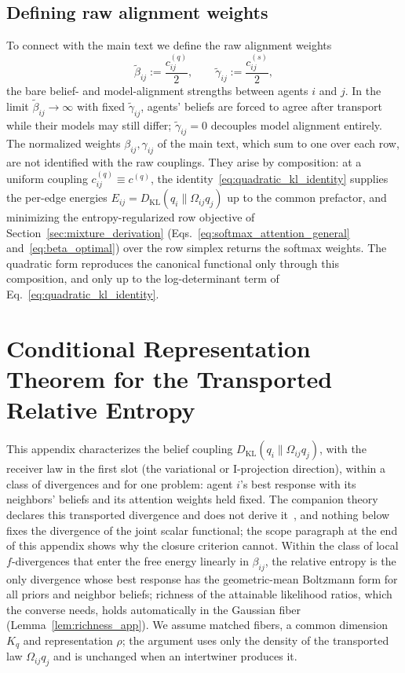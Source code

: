 \subsection{Defining raw alignment weights}
\label{sec:raw_alignment_weights}
To connect with the main text we define the raw alignment weights
\begin{equation}
\tilde\beta_{ij}:=\frac{c^{(q)}_{ij}}{2},
\qquad
\tilde\gamma_{ij}:=\frac{c^{(s)}_{ij}}{2},
\end{equation}
the bare belief- and model-alignment strengths between agents $i$ and $j$. In the limit $\tilde\beta_{ij} \to \infty$ with fixed $\tilde\gamma_{ij}$, agents' beliefs are forced to agree after transport while their models may still differ; $\tilde\gamma_{ij} = 0$ decouples model alignment entirely. The normalized weights $\beta_{ij}, \gamma_{ij}$ of the main text, which sum to one over each row, are not identified with the raw couplings. They arise by composition: at a uniform coupling $c^{(q)}_{ij} \equiv c^{(q)}$, the identity~\eqref{eq:quadratic_kl_identity} supplies the per-edge energies $E_{ij} = D_{\mathrm{KL}}(q_i \| \Omega_{ij}q_j)$ up to the common prefactor, and minimizing the entropy-regularized row objective of Section~\ref{sec:mixture_derivation} (Eqs.~\eqref{eq:softmax_attention_general} and~\eqref{eq:beta_optimal}) over the row simplex returns the softmax weights. The quadratic form reproduces the canonical functional only through this composition, and only up to the log-determinant term of Eq.~\eqref{eq:quadratic_kl_identity}.

\section{Conditional Representation Theorem for the Transported Relative Entropy}
\label{app:conditional_representation}

This appendix characterizes the belief coupling $D_{\mathrm{KL}}(q_i\|\Omega_{ij}q_j)$, with the receiver law in the first slot (the variational or I-projection direction), within a class of divergences and for one problem: agent $i$'s best response with its neighbors' beliefs and its attention weights held fixed. The companion theory declares this transported divergence and does not derive it~\cite[Chs.~6 and~12]{DennisGaugeVFE2026}, and nothing below fixes the divergence of the joint scalar functional; the scope paragraph at the end of this appendix shows why the closure criterion cannot. Within the class of local $f$-divergences that enter the free energy linearly in $\beta_{ij}$, the relative entropy is the only divergence whose best response has the geometric-mean Boltzmann form for all priors and neighbor beliefs; richness of the attainable likelihood ratios, which the converse needs, holds automatically in the Gaussian fiber (Lemma~\ref{lem:richness_app}). We assume matched fibers, a common dimension $K_q$ and representation $\rho$; the argument uses only the density of the transported law $\Omega_{ij}q_j$ and is unchanged when an intertwiner produces it.

